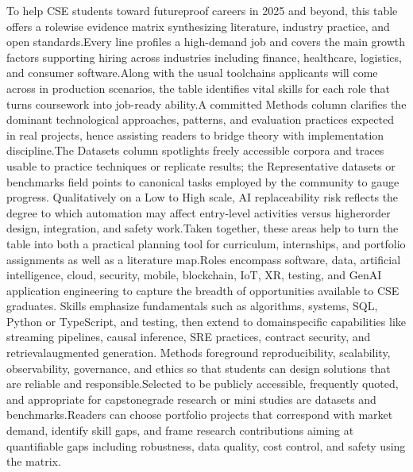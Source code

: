 \documentclass[final,5p,times,twocolumn]{elsarticle}
\begin{document}
To help CSE students toward futureproof careers in 2025 and beyond, this table offers a rolewise evidence matrix synthesizing literature, industry practice, and open standards.Every line profiles a high-demand job and covers the main growth factors supporting hiring across industries including finance, healthcare, logistics, and consumer software.Along with the usual toolchains applicants will come across in production scenarios, the table identifies vital skills for each role that turns coursework into job-ready ability.A committed Methods column clarifies the dominant technological approaches, patterns, and evaluation practices expected in real projects, hence assisting readers to bridge theory with implementation discipline.The Datasets column spotlights freely accessible corpora and traces usable to practice techniques or replicate results; the Representative datasets or benchmarks field points to canonical tasks employed by the community to gauge progress. Qualitatively on a Low to High scale, AI replaceability risk reflects the degree to which automation may affect entry-level activities versus higherorder design, integration, and safety work.Taken together, these areas help to turn the table into both a practical planning tool for curriculum, internships, and portfolio assignments as well as a literature map.Roles encompass software, data, artificial intelligence, cloud, security, mobile, blockchain, IoT, XR, testing, and GenAI application engineering to capture the breadth of opportunities available to CSE graduates. Skills emphasize fundamentals such as algorithms, systems, SQL, Python or TypeScript, and testing, then extend to domainspecific capabilities like streaming pipelines, causal inference, SRE practices, contract security, and retrievalaugmented generation. Methods foreground reproducibility, scalability, observability, governance, and ethics so that students can design solutions that are reliable and responsible.Selected to be publicly accessible, frequently quoted, and appropriate for capstonegrade research or mini studies are datasets and benchmarks.Readers can choose portfolio projects that correspond with market demand, identify skill gaps, and frame research contributions aiming at quantifiable gaps including robustness, data quality, cost control, and safety using the matrix.


\end{document}
